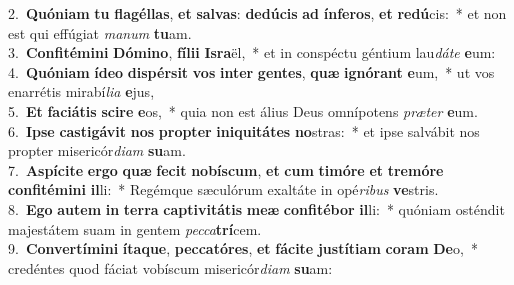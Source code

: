 {2.~}\textbf{Quó}\textbf{ni}\textbf{am} \textbf{tu} \textbf{fla}\textbf{gél}\textbf{las}, \textbf{et} \textbf{sal}\textbf{vas}: \textbf{de}\textbf{dú}\textbf{cis} \textbf{ad} \textbf{ín}\textbf{fe}\textbf{ros}, \textbf{et} \textbf{re}\textbf{dú}cis:~* et non est qui effúgiat \textit{ma}\textit{num} \textbf{tu}am.\\
{3.~}\textbf{Con}\textbf{fi}\textbf{té}\textbf{mi}\textbf{ni} \textbf{Dó}\textbf{mi}\textbf{no}, \textbf{fí}\textbf{li}\textbf{i} \textbf{Is}\textbf{ra}ël,~* et in conspéctu géntium lau\textit{dá}\textit{te} \textbf{e}um:\\
{4.~}\textbf{Quó}\textbf{ni}\textbf{am} \textbf{í}\textbf{de}\textbf{o} \textbf{di}\textbf{spér}\textbf{sit} \textbf{vos} \textbf{in}\textbf{ter} \textbf{gen}\textbf{tes}, \textbf{quæ} \textbf{i}\textbf{gnó}\textbf{rant} \textbf{e}um,~* ut vos enarrétis mirabí\textit{li}\textit{a} \textbf{e}jus,\\
{5.~}\textbf{Et} \textbf{fa}\textbf{ci}\textbf{á}\textbf{tis} \textbf{sci}\textbf{re} \textbf{e}os,~* quia non est álius Deus omnípotens \textit{præ}\textit{ter} \textbf{e}um.\\
{6.~}\textbf{I}\textbf{pse} \textbf{ca}\textbf{sti}\textbf{gá}\textbf{vit} \textbf{nos} \textbf{prop}\textbf{ter} \textbf{i}\textbf{ni}\textbf{qui}\textbf{tá}\textbf{tes} \textbf{no}stras:~* et ipse salvábit nos propter misericór\textit{di}\textit{am} \textbf{su}am.\\
{7.~}\textbf{A}\textbf{spí}\textbf{ci}\textbf{te} \textbf{er}\textbf{go} \textbf{quæ} \textbf{fe}\textbf{cit} \textbf{no}\textbf{bí}\textbf{scum}, \textbf{et} \textbf{cum} \textbf{ti}\textbf{mó}\textbf{re} \textbf{et} \textbf{tre}\textbf{mó}\textbf{re} \textbf{con}\textbf{fi}\textbf{té}\textbf{mi}\textbf{ni} \textbf{il}li:~* Regémque sæculórum exaltáte in opé\textit{ri}\textit{bus} \textbf{ve}stris.\\
{8.~}\textbf{E}\textbf{go} \textbf{au}\textbf{tem} \textbf{in} \textbf{ter}\textbf{ra} \textbf{cap}\textbf{ti}\textbf{vi}\textbf{tá}\textbf{tis} \textbf{me}\textbf{æ} \textbf{con}\textbf{fi}\textbf{té}\textbf{bor} \textbf{il}li:~* quóniam osténdit majestátem suam in gentem \textit{pec}\textit{ca}\textbf{trí}cem.\\
{9.~}\textbf{Con}\textbf{ver}\textbf{tí}\textbf{mi}\textbf{ni} \textbf{í}\textbf{ta}\textbf{que}, \textbf{pec}\textbf{ca}\textbf{tó}\textbf{res}, \textbf{et} \textbf{fá}\textbf{ci}\textbf{te} \textbf{ju}\textbf{stí}\textbf{ti}\textbf{am} \textbf{co}\textbf{ram} \textbf{De}o,~* credéntes quod fáciat vobíscum misericór\textit{di}\textit{am} \textbf{su}am:\\
